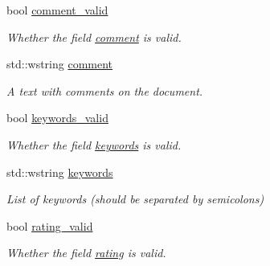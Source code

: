 \begin{DoxyCompactItemize}
bool \hyperlink{structlib_c_z_i_1_1_general_document_info_a3a4c9285ee92894e86b591a24c3048ba}{comment\+\_\+valid}
\begin{DoxyCompactList}\small\item\em Whether the field \hyperlink{structlib_c_z_i_1_1_general_document_info_a633f48b2bd3356c426a0716ffbae45ae}{comment} is valid. \end{DoxyCompactList}\item 
\mbox{\label{structlib_c_z_i_1_1_general_document_info_a633f48b2bd3356c426a0716ffbae45ae}} 
std\+::wstring \hyperlink{structlib_c_z_i_1_1_general_document_info_a633f48b2bd3356c426a0716ffbae45ae}{comment}
\begin{DoxyCompactList}\small\item\em A text with comments on the document. \end{DoxyCompactList}\item 
\mbox{\label{structlib_c_z_i_1_1_general_document_info_ada461daf6873d7809d4202c9d2a55fc0}} 
bool \hyperlink{structlib_c_z_i_1_1_general_document_info_ada461daf6873d7809d4202c9d2a55fc0}{keywords\+\_\+valid}
\begin{DoxyCompactList}\small\item\em Whether the field \hyperlink{structlib_c_z_i_1_1_general_document_info_adee12c915203b5bd17d150f362320e83}{keywords} is valid. \end{DoxyCompactList}\item 
\mbox{\label{structlib_c_z_i_1_1_general_document_info_adee12c915203b5bd17d150f362320e83}} 
std\+::wstring \hyperlink{structlib_c_z_i_1_1_general_document_info_adee12c915203b5bd17d150f362320e83}{keywords}
\begin{DoxyCompactList}\small\item\em List of keywords (should be separated by semicolons) \end{DoxyCompactList}\item 
\mbox{\label{structlib_c_z_i_1_1_general_document_info_a460546de9c8871c3c8df603acdc08ecf}} 
bool \hyperlink{structlib_c_z_i_1_1_general_document_info_a460546de9c8871c3c8df603acdc08ecf}{rating\+\_\+valid}
\begin{DoxyCompactList}\small\item\em Whether the field \hyperlink{structlib_c_z_i_1_1_general_document_info_a26ded0bae7ffb1bc68fef7f1862c0508}{rating} is valid. \end{DoxyCompactList}\item 

\end{DoxyCompactItemize}
